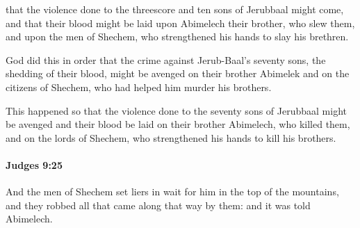 			\begin{versebox}
					\item[BHS] 
					\item[ASV] that the violence done to the threescore and ten sons of Jerubbaal might come, and that their blood might be laid upon Abimelech their brother, who slew them, and upon the men of Shechem, who strengthened his hands to slay his brethren.
					\item[NIV] God did this in order that the crime against Jerub-Baal’s seventy sons, the shedding of their blood, might be avenged on their brother Abimelek and on the citizens of Shechem, who had helped him murder his brothers.
					\item[NRSV] This happened so that the violence done to the seventy sons of Jerubbaal might be avenged and their blood be laid on their brother Abimelech, who killed them, and on the lords of Shechem, who strengthened his hands to kill his brothers.
			\end{versebox}

		\paragraph{Judges 9:25} %
			\label{JUDGES-9-25}

			And the men of Shechem set liers in wait for him in the top of the mountains, and they robbed all that came along that way by them: and it was told Abimelech.

